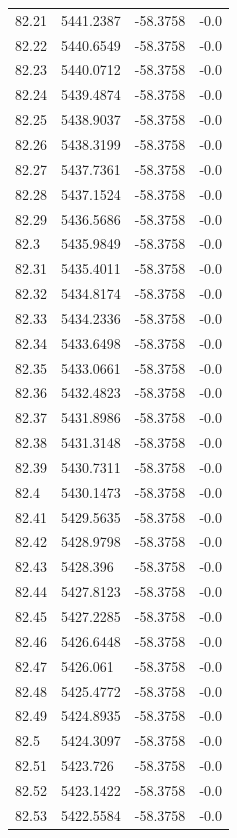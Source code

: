 \begin{table}[H]
\begin{tabular}{llll}
82.21 & 5441.2387 & -58.3758 & -0.0 \\
82.22 & 5440.6549 & -58.3758 & -0.0 \\
82.23 & 5440.0712 & -58.3758 & -0.0 \\
82.24 & 5439.4874 & -58.3758 & -0.0 \\
82.25 & 5438.9037 & -58.3758 & -0.0 \\
82.26 & 5438.3199 & -58.3758 & -0.0 \\
82.27 & 5437.7361 & -58.3758 & -0.0 \\
82.28 & 5437.1524 & -58.3758 & -0.0 \\
82.29 & 5436.5686 & -58.3758 & -0.0 \\
82.3 & 5435.9849 & -58.3758 & -0.0 \\
82.31 & 5435.4011 & -58.3758 & -0.0 \\
82.32 & 5434.8174 & -58.3758 & -0.0 \\
82.33 & 5434.2336 & -58.3758 & -0.0 \\
82.34 & 5433.6498 & -58.3758 & -0.0 \\
82.35 & 5433.0661 & -58.3758 & -0.0 \\
82.36 & 5432.4823 & -58.3758 & -0.0 \\
82.37 & 5431.8986 & -58.3758 & -0.0 \\
82.38 & 5431.3148 & -58.3758 & -0.0 \\
82.39 & 5430.7311 & -58.3758 & -0.0 \\
82.4 & 5430.1473 & -58.3758 & -0.0 \\
82.41 & 5429.5635 & -58.3758 & -0.0 \\
82.42 & 5428.9798 & -58.3758 & -0.0 \\
82.43 & 5428.396 & -58.3758 & -0.0 \\
82.44 & 5427.8123 & -58.3758 & -0.0 \\
82.45 & 5427.2285 & -58.3758 & -0.0 \\
82.46 & 5426.6448 & -58.3758 & -0.0 \\
82.47 & 5426.061 & -58.3758 & -0.0 \\
82.48 & 5425.4772 & -58.3758 & -0.0 \\
82.49 & 5424.8935 & -58.3758 & -0.0 \\
82.5 & 5424.3097 & -58.3758 & -0.0 \\
82.51 & 5423.726 & -58.3758 & -0.0 \\
82.52 & 5423.1422 & -58.3758 & -0.0 \\
82.53 & 5422.5584 & -58.3758 & -0.0 \\

\end{tabular}
\end{table}
